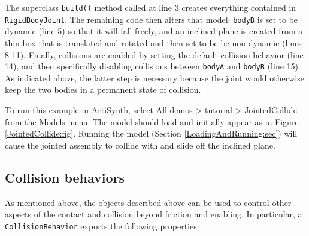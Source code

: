 The superclass {\tt build()} method called at line 3 creates
everything contained in {\tt RigidBodyJoint}. The remaining code then
alters that model: {\tt bodyB} is set to be dynamic (line 5) so that
it will fall freely, and an inclined plane is created from a thin box
that is translated and rotated and then set to be be non-dynamic
(lines 8-11).  Finally, collisions are enabled by setting the default
collision behavior (line 14), and then specifically disabling
collisions between {\tt bodyA} and {\tt bodyB} (line 15). As indicated
above, the latter step is necessary because the joint would otherwise
keep the two bodies in a permanent state of collision.

To run this example in ArtiSynth, select {\sf All demos > tutorial >
JointedCollide} from the {\sf Models} menu. The model should load and
initially appear as in Figure \ref{JointedCollide:fig}.  Running
the model (Section \ref{LoadingAndRunning:sec}) will
cause the jointed assembly to collide with and slide off the inclined
plane.

\subsection{Collision behaviors}
\label{collisionBehavior:sec}

As mentioned above, the
 objects
described above can be used to control other aspects of the contact
and collision beyond friction and enabling. In particular, a {\tt
CollisionBehavior} exports the following properties:

